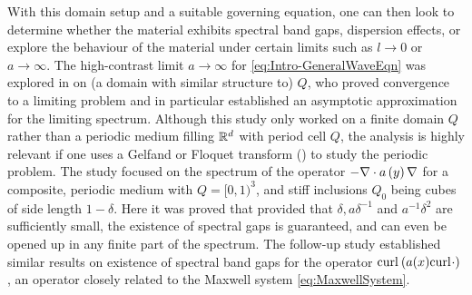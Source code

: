 With this domain setup and a suitable governing equation, one can then look to determine whether the material exhibits spectral band gaps, dispersion effects, or explore the behaviour of the material under certain limits such as $l\rightarrow0$ or $a\rightarrow\infty$.
The high-contrast limit $a\rightarrow\infty$ for \eqref{eq:Intro-GeneralWaveEqn} was explored in  on (a domain with similar structure to) $Q$, who proved convergence to a limiting problem and in particular established an asymptotic approximation for the limiting spectrum.
Although this study only worked on a finite domain $Q$ rather than a periodic medium filling $\mathbb{R}^d$ with period cell $Q$, the analysis is highly relevant if one uses a Gelfand or Floquet transform () to study the periodic problem.
The study  focused on the spectrum of the operator $-\nabla\cdot a\left( y \right)\nabla$ for a composite, periodic medium with $Q=[0,1)^3$, and stiff inclusions $Q_0$ being cubes of side length $1-\delta$.
Here it was proved that provided that $\delta, a\delta^{-1}$ and $a^{-1}\delta^2$ are sufficiently small, the existence of spectral gaps is guaranteed, and can even be opened up in any finite part of the spectrum.
The follow-up study  established similar results on existence of spectral band gaps for the operator $\mathrm{curl}_{}\left( a(x)\mathrm{curl}_{}\cdot \right)$, an operator closely related to the Maxwell system \eqref{eq:MaxwellSystem}.


